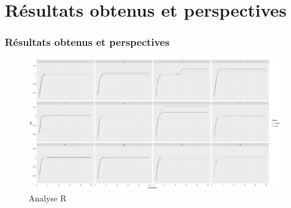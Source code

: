\section{Résultats obtenus et perspectives}

\begin{frame}
	\frametitle{Résultats obtenus et perspectives}
	\begin{figure}[h]
		\centering
		\includegraphics[width=0.8\linewidth]{images/analyseRStudio1}
		\caption{Analyse R}
	\end{figure}
\end{frame}

